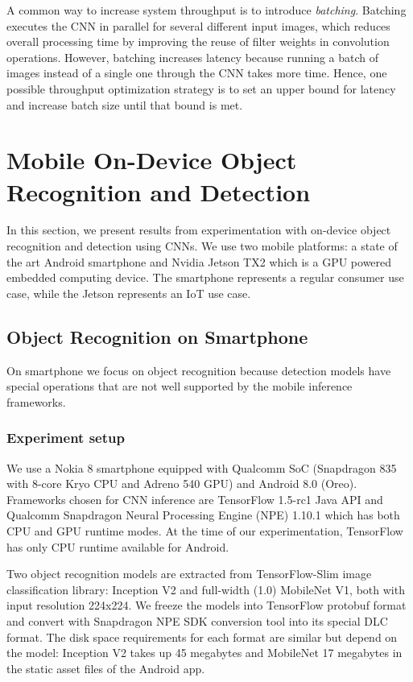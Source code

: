 \documentclass[sigconf]{acmart}
\begin{document}
A common way to increase system throughput is to introduce \textit{batching}. Batching executes the CNN in parallel for several different input images, which reduces overall processing time by improving the reuse of filter weights in convolution operations. However, batching increases latency because running a batch of images instead of a single one through the CNN takes more time. Hence, one possible throughput optimization strategy is to set an upper bound for latency and increase batch size until that bound is met.



\section{Mobile On-Device Object Recognition and Detection}\label{sec:mobile}

In this section, we present results from experimentation with on-device object recognition and detection using CNNs. We use two mobile platforms: a state of the art Android smartphone and Nvidia Jetson TX2 which is a GPU powered embedded computing device. The smartphone represents a regular consumer use case, while the Jetson represents an IoT use case.

\subsection{Object Recognition on Smartphone}\label{sec:android_recognition}
On smartphone we focus on object recognition because detection models have special operations that are not well supported by the mobile inference frameworks.

\subsubsection{Experiment setup}

We use a Nokia 8 smartphone equipped with Qualcomm SoC (Snapdragon 835 with 8-core Kryo CPU and Adreno 540 GPU) and Android 8.0 (Oreo). Frameworks chosen for CNN inference are TensorFlow 1.5-rc1 Java API and Qualcomm Snapdragon Neural Processing Engine (NPE) 1.10.1 which has both CPU and GPU runtime modes. At the time of our experimentation, TensorFlow has only CPU runtime available for Android.

Two object recognition models are extracted from TensorFlow-Slim image classification library: Inception V2 and full-width (1.0) MobileNet V1, both with input resolution 224x224. We freeze the models into TensorFlow protobuf format and convert with Snapdragon NPE SDK conversion tool into its special DLC format. The disk space requirements for each format are similar but depend on the model: Inception V2 takes up 45 megabytes and MobileNet 17 megabytes in the static asset files of the Android app.
\end{document}
